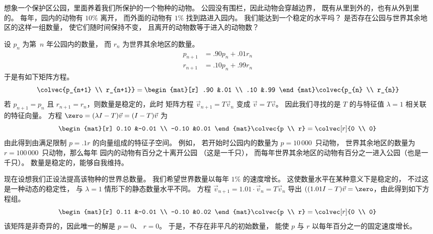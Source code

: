 想象一个保护区公园，里面养着我们所保护的一个物种的动物。
公园没有围栏，因此动物会穿越边界，
既有从里到外的，也有从外到里的。
每年，园内的动物有 $10\%$ 离开，
而外面的动物有 $1\%$
找到路进入园内。
我们能达到一个稳定的水平吗？
是否存在公园与世界其余地区的这样一组数量，
使它们随时间保持不变，
且离开的动物数等于进入的动物数？

设 $p_n$ 为第~$n$ 年公园内的数量，
而 $r_n$ 为世界其余地区的数量。
\begin{align*}
  p_{n+1}
  &=.90p_n+.01r_n    \\
  r_{n+1}
  &=.10p_n+.99r_n
\end{align*}
于是有如下矩阵方程。
\begin{equation*}
  \colvec{p_{n+1} \\ r_{n+1}}
  =\begin{mat}[r]
    .90  &.01  \\
    .10  &.99
  \end{mat}
  \colvec{p_{n} \\ r_{n}}
\end{equation*}
若 $p_{n+1}=p_n$ 且 $r_{n+1}=r_n$，则数量是稳定的，此时
矩阵方程 $\vec{v}_{n+1}=T\vec{v}_{n}$ 变成 $\vec{v}=T\vec{v}$。
因此我们寻找的是 $T$ 的与特征值 $\lambda=1$
相关联的特征向量。
方程 $\zero=(\lambda I-T)\vec{v}=(I-T)\vec{v}$ 为
\begin{equation*}
  \begin{mat}[r]
      0.10  &-0.01  \\
      -0.10  &0.01
  \end{mat}
  \colvec{p \\ r}=
  \colvec[r]{0 \\ 0}
\end{equation*}
由此得到由满足限制 $p=.1r$ 的向量组成的特征子空间。
例如，
若开始时公园内的数量为 $p=10\,000$~只动物，
世界其余地区的数量为 $r=100\,000$~只动物，那么每年
园内的动物有百分之十离开公园
（这是一千只），
而每年世界其余地区的动物有百分之一进入公园（也是一千只）。
数量是稳定的，能够自我维持。

现在设想我们正设法提高该物种的世界总数量。
我们希望世界数量以每年
$1\%$ 的速度增长。
这使数量水平在某种意义下是稳定的，
不过这是一种动态的稳定性，
与 $\lambda=1$ 情形下的静态数量水平不同。
方程 $\vec{v}_{n+1}=1.01\cdot\vec{v}_n=T\vec{v}_{n}$ 导出
$((1.01 I-T)\vec{v}=\zero$，由此得到如下方程组。
\begin{equation*}
  \begin{mat}[r]
     0.11   &-0.01  \\
     -0.10  &0.02
  \end{mat}
  \colvec{p \\ r}=
  \colvec[r]{0 \\ 0}
\end{equation*}
该矩阵是非奇异的，因此唯一的解是 $p=0$、
$r=0$。
于是，不存在非平凡的初始数量，
能使 $p$ 与 $r$ 以每年百分之一的固定速度增长。

